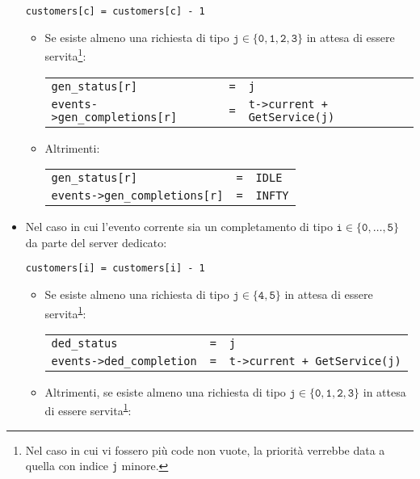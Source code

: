 \begin{itemize}
\begin{center}
\texttt{customers[c] = customers[c] - 1}
\end{center}
\begin{itemize}
\item Se esiste almeno una richiesta di tipo $\mathtt{j \in \lbrace 0, 1, 2, 3 \rbrace}$ in attesa di essere servita\footnote{\label{note:modello-computazionale-1}Nel caso in cui vi fossero più code non vuote, la priorità verrebbe data a quella con indice \texttt{j} minore.}:
\begin{center}
\begin{tabular}{l l l}
\texttt{gen\_status[r]} & \texttt{=} & \texttt{j} \\
\texttt{events->gen\_completions[r]} & \texttt{=} & \texttt{t->current + GetService(j)}
\end{tabular}
\end{center}
\item Altrimenti:
\begin{center}
\begin{tabular}{l l l}
\texttt{gen\_status[r]} & \texttt{=} & \texttt{IDLE} \\
\texttt{events->gen\_completions[r]} & \texttt{=} & \texttt{INFTY}
\end{tabular}
\end{center}
\end{itemize}
\item Nel caso in cui l'evento corrente sia un completamento di tipo $\mathtt{i \in \lbrace 0, \dots, 5 \rbrace}$ da parte del server dedicato:
\begin{center}
\texttt{customers[i] = customers[i] - 1}
\end{center}
\begin{itemize}
\item Se esiste almeno una richiesta di tipo $\mathtt{j \in \lbrace 4, 5 \rbrace}$ in attesa di essere servita\textsuperscript{\ref{note:modello-computazionale-1}}:
\begin{center}
\begin{tabular}{l l l}
\texttt{ded\_status} & \texttt{=} & \texttt{j} \\
\texttt{events->ded\_completion} & \texttt{=} & \texttt{t->current + GetService(j)}
\end{tabular}
\end{center}
\item Altrimenti, se esiste almeno una richiesta di tipo $\mathtt{j \in \lbrace 0, 1, 2, 3 \rbrace}$ in attesa di essere servita\textsuperscript{\ref{note:modello-computazionale-1}}:

\end{itemize}
\end{itemize}
